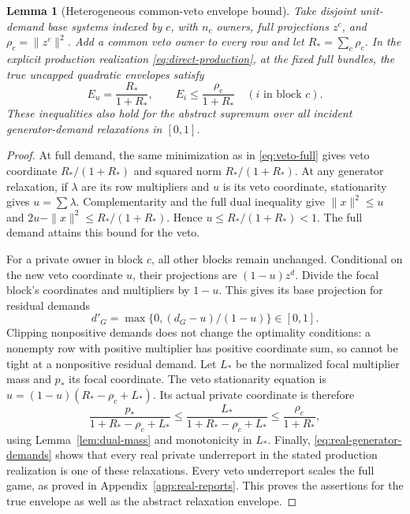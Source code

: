 \documentclass[11pt]{article}
\newtheorem{lemma}[theorem]{Lemma}
\theoremstyle{definition}
\theoremstyle{remark}
\begin{document}
\begin{lemma}[Heterogeneous common-veto envelope bound]
\label{lem:veto-cap}
Take disjoint unit-demand base systems indexed by $c$, with $n_c$ owners,
full projections $z^c$, and $\rho_c=\|z^c\|^2$.  Add a common veto owner
to every row and let $R_* =\sum_c\rho_c$.  In the explicit production
realization \eqref{eq:direct-production}, at the fixed full bundles,
the true uncapped quadratic envelopes satisfy
\begin{equation}
 E_u=\frac{R_*}{1+R_*},\qquad
 E_i\le\frac{\rho_c}{1+R_*}\quad(i\text{ in block }c).
 \label{eq:class-cap}
\end{equation}
These inequalities also hold for the abstract supremum over all
incident generator-demand relaxations in $[0,1]$.
\end{lemma}
\begin{proof}
At full demand, the same minimization as in \eqref{eq:veto-full} gives
veto coordinate $R_* /(1+R_*)$ and squared norm $R_* /(1+R_*)$.
At any generator relaxation, if $\lambda$ are its row multipliers and
$u$ is its veto coordinate, stationarity gives $u=\sum\lambda$.
Complementarity and the full dual inequality give
$\|x\|^2\le u$ and $2u-\|x\|^2\le R_* /(1+R_*)$.
Hence $u\le R_* /(1+R_*)<1$.  The full demand attains this bound for the
veto.

For a private owner in block $c$, all other blocks remain unchanged.
Conditional on the new veto coordinate $u$, their projections are
$(1-u)z^d$.  Divide the focal block's coordinates and multipliers by
$1-u$.  This gives its base projection for residual demands
\[
 d'_G=\max\{0,(d_G-u)/(1-u)\}\in[0,1].
\]
Clipping nonpositive demands does not change the optimality conditions:
a nonempty row with positive multiplier has positive coordinate sum,
so cannot be tight at a nonpositive residual demand.  Let $L_*$ be the
normalized focal multiplier mass and $p_*$ its focal coordinate.
The veto stationarity equation is
$u=(1-u)(R_* -\rho_c+L_*)$.  Its actual private coordinate is therefore
\[
 \frac{p_*}{1+R_* -\rho_c+L_*}
 \le\frac{L_*}{1+R_* -\rho_c+L_*}
 \le\frac{\rho_c}{1+R_*},
\]
using Lemma~\ref{lem:dual-mass} and monotonicity in $L_*$.  Finally,
\eqref{eq:real-generator-demands} shows that every real private
underreport in the stated production realization is one of these
relaxations.  Every veto underreport scales the full game, as proved
in Appendix~\ref{app:real-reports}.  This proves the assertions for the
true envelope as well as the abstract relaxation envelope.
\end{proof}
\end{document}
